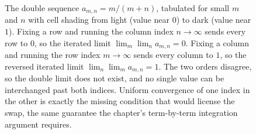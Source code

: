 \begin{figure}[ht]
\centering
{}
\caption[Order of limits matters for a double sequence]{The double sequence
$a_{m,n}=m/(m+n)$, tabulated for small $m$ and $n$ with cell shading from
light (value near $0$) to dark (value near $1$). Fixing a row and running
the column index $n\to\infty$ sends every row to $0$, so the iterated limit
$\lim_{m}\lim_{n}a_{m,n}=0$. Fixing a column and running the row index
$m\to\infty$ sends every column to $1$, so the reversed iterated limit
$\lim_{n}\lim_{m}a_{m,n}=1$. The two orders disagree, so the double limit
does not exist, and no single value can be interchanged past both indices.
Uniform convergence of one index in the other is exactly the missing
condition that would license the swap, the same guarantee the chapter's
term-by-term integration argument requires.}
\label{fig:vol02:ch04:double-limit}
\end{figure}

